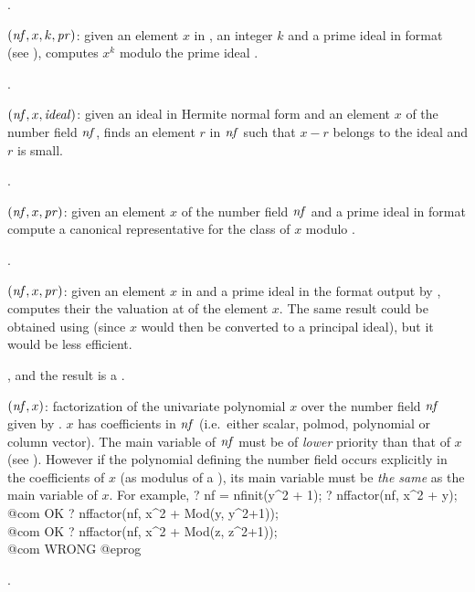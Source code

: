 .

$(\hbox{\it nf\/},x,k,\hbox{\it pr\/})$: given an element $x$ in
, an integer $k$ and a prime ideal  in  format
(see ), computes $x^k$ modulo the prime ideal .

.

$(\hbox{\it nf\/},x,\hbox{\it ideal\/})$: given an ideal in
Hermite normal form and an element $x$ of the number field $\hbox{\it nf\/}$,
finds an element $r$ in $\hbox{\it nf\/}$ such that $x-r$ belongs to the ideal
and $r$ is small.

.

$(\hbox{\it nf\/},x,\hbox{\it pr\/})$: given
an element $x$ of the number field $\hbox{\it nf\/}$ and a prime ideal  in
 format compute a canonical representative for the class of $x$
modulo .

.

$(\hbox{\it nf\/},x,\hbox{\it pr\/})$: given an element $x$ in
 and a prime ideal  in the format output by
, computes their the valuation at  of the
element $x$. The same result could be obtained using
 (since $x$ would then be converted to a
principal ideal), but it would be less efficient.

, and the result is a .

$(\hbox{\it nf\/},x)$: factorization of the univariate
polynomial $x$ over the number field $\hbox{\it nf\/}$ given by . $x$
has coefficients in $\hbox{\it nf\/}$ (i.e.~either scalar, polmod, polynomial or
column vector). The main variable of $\hbox{\it nf\/}$ must be of \emph{lower}
priority than that of $x$ (see ). However if
the polynomial defining the number field occurs explicitly  in the
coefficients of $x$ (as modulus of a ), its main variable must be
\emph{the same} as the main variable of $x$. For example,
\bprog
? nf = nfinit(y^2 + 1);
? nffactor(nf, x^2 + y); \\@com OK
? nffactor(nf, x^2 + Mod(y, y^2+1)); \\ @com OK
? nffactor(nf, x^2 + Mod(z, z^2+1)); \\ @com WRONG
@eprog

.

